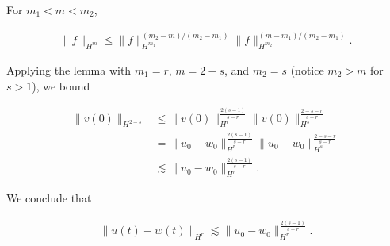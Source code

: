 \documentclass{beamer}
\numberwithin{equation}{section}
\begin{document}
 \begin{frame}
     \begin{lemma}[Interpolation]
  For $m_{1} < m < m_{2}$,
  
  
  \begin{equation*}
  \begin{split}
    \| f \|_{H^{m}} \le \| f \|_{H^{m_{1}}}^{(m_{2}-m)/(m_{2} - m_{1})} \| f
    \|_{H^{m_{2}}}^{(m -m_{1})/(m_{2} - m_{1})}.
  \end{split}
  \end{equation*}
  
  
  
   
  
\label{lem:interp}
\end{lemma}

\pause
Applying the lemma with $m_{1} =r$, $m = 2-s$, and $m_{2} = s$ (notice
$m_{2} > m$ for $s > 1$), we bound 


\begin{equation*}
\begin{split}
    \| v(0) \|_{H^{2-s}} 
    & \le \| v(0) \|_{H^{r}}^{\frac{2(s-1)}{s-r}} \|v(0)
  \|_{H^{s}}^{\frac{2-s-r}{s-r}}
  \\
  & = \| u_{0} - w_{0} \|_{H^{r}}^{\frac{2(s-1)}{s-r}} \|u_{0} - w_{0}
  \|_{H^{s}}^{\frac{2-s-r}{s-r}}
  \\
  & \lesssim \| u_{0} - w_{0} \|_{H^{r}}^{\frac{2(s-1)}{s-r}}.
\end{split}
\end{equation*}

\pause
We conclude that


\begin{equation*}
\begin{split}
  \| u(t) - w(t) \|_{H^{r}} \lesssim \|u_{0} - w_{0} \|_{H^{r}}^{\frac{2(s-1)}{s-r}}.
\end{split}
\end{equation*}

\end{frame}
\end{document}
